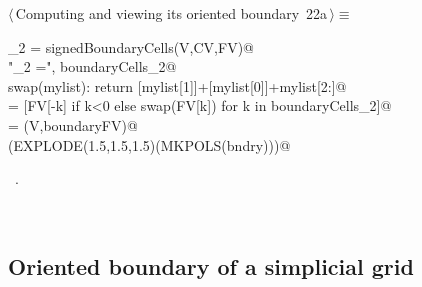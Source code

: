 \documentclass[11pt,oneside]{article}	%
\begin{document}
\begin{flushleft} \small
\begin{minipage}{\linewidth} \label{scrap50}
\protect{}$\langle\,$Computing and viewing its oriented boundary\nobreak\ {\footnotesize 22a}$\,\rangle\equiv$
\vspace{-1ex}
\begin{list}{}{} \item
\mbox{}\verb@boundaryCells_2 = signedBoundaryCells(V,CV,FV)@\\
\mbox{}\verb@print "\nboundaryCells_2 =\n", boundaryCells_2@\\
\mbox{}\verb@def swap(mylist): return [mylist[1]]+[mylist[0]]+mylist[2:]@\\
\mbox{}\verb@boundaryFV = [FV[-k] if k<0 else swap(FV[k]) for k in boundaryCells_2]@\\
\mbox{}\verb@bndry = (V,boundaryFV)@\\
\mbox{}\verb@VIEW(EXPLODE(1.5,1.5,1.5)(MKPOLS(bndry)))@\\
\mbox{}\verb@@{\NWsep}
\end{list}
\vspace{-1ex}
\footnotesize\addtolength{\baselineskip}{-1ex}
\begin{list}{}{\setlength{\itemsep}{-\parsep}\setlength{\itemindent}{-\leftmargin}}
\item \NWtxtMacroRefIn\ .
\end{list}
\end{minipage}\\[4ex]
\end{flushleft}

\subsection{Oriented boundary of a simplicial grid}
\end{document}

